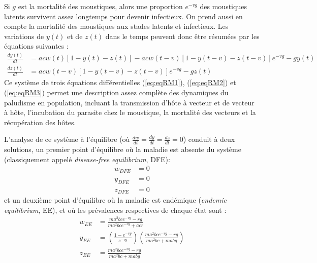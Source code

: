 Si $g$ est la mortalité des moustiques, alors une proportion $e^{-vg}$ des moustiques latents survivent assez longtemps pour devenir infectieux.
On prend aussi en compte la mortalité des moustiques aux stades latents et infectieux.
Les variations de $y(t)$ et de $z(t)$ dans le temps peuvent donc être résumées par les équations suivantes :
\begin{align}
\label{eq:eqRM2}
\frac{dy(t)}{dt} &= acw(t)[1-y(t)-z(t)] - acw(t-v)[1-{y(t-v)}-{z(t-v)}]e^{-vg} - gy(t) \\
\label{eq:eqRM3}
\frac{dz(t)}{dt} &=  acw(t-v)[1-{y(t-v)}-{z(t-v)}]e^{-vg} - gz(t)
\end{align}
Ce système de trois équations différentielles (\ref{eq:eqRM1}), (\ref{eq:eqRM2}) et (\ref{eq:eqRM3}) permet une description  assez complète des dynamiques du paludisme en population, incluant la transmission d'hôte à vecteur et de vecteur à hôte, l'incubation du parasite chez le moustique, la mortalité des vecteurs et la récupération des hôtes.

L'analyse de ce système à l'équilibre (où $\frac{dw}{dt}=\frac{dy}{dt}=\frac{dz}{dt}=0$) conduit à deux solutions, un premier point d'équilibre où la maladie est absente du système (classiquement appelé {\em disease-free equilibrium}, DFE):
\begin{align}
w_{DFE} &= 0 \\ \nonumber
y_{DFE} &= 0 \\ \nonumber
z_{DFE} &= 0 
\end{align}
et un deuxième point d'équilibre où la maladie est endémique ({\em endemic equilibrium}, EE), et où les prévalences respectives de chaque état sont :
\begin{align}
w_{EE} &= \frac{ma^2bce^{-vg}-rg}{ma^2bce^{-vg}+acr} \\ \nonumber
y_{EE} &= \left( \frac{1-e^{-vg}}{e^{-vg}} \right)\left( \frac{ma^2bce^{-vg}-rg}{ma^2bc + mabg} \right)\\ \nonumber
z_{EE} &= \frac{ma^2bce^{-vg}-rg}{ma^2bc+mabg}
\end{align}

